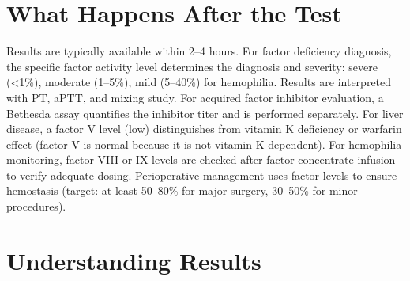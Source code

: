 \section*{What Happens After the Test}
Results are typically available within 2--4 hours. For factor deficiency diagnosis, the specific factor activity level determines the diagnosis and severity: severe (<1\%), moderate (1--5\%), mild (5--40\%) for hemophilia. Results are interpreted with PT, aPTT, and mixing study. For acquired factor inhibitor evaluation, a Bethesda assay quantifies the inhibitor titer and is performed separately. For liver disease, a factor V level (low) distinguishes from vitamin K deficiency or warfarin effect (factor V is normal because it is not vitamin K-dependent). For hemophilia monitoring, factor VIII or IX levels are checked after factor concentrate infusion to verify adequate dosing. Perioperative management uses factor levels to ensure hemostasis (target: at least 50--80\% for major surgery, 30--50\% for minor procedures).

\section*{Understanding Results}

